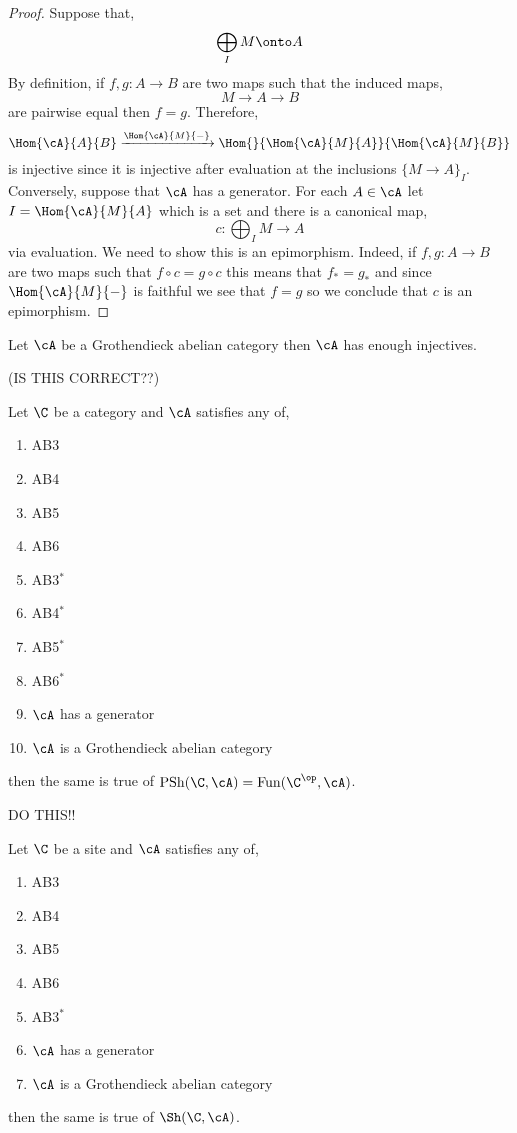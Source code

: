 \documentclass[12pt]{article}
\begin{document}
\begin{proof}
Suppose that,
\[ \bigoplus_I M \onto A \]
By definition, if $f,g : A \to B$ are two maps such that the induced maps,
\[ M \to A \to B \]
are pairwise equal then $f = g$. Therefore,
\[ \Hom{\cA}{A}{B} \xrightarrow{\Hom{\cA}{M}{-}} \Hom{}{\Hom{\cA}{M}{A}}{\Hom{\cA}{M}{B}} \]
is injective since it is injective after evaluation at the inclusions $\{ M \to A \}_I$.
\bigskip\\
Conversely, suppose that $\cA$ has a generator. For each $A \in \cA$ let $I = \Hom{\cA}{M}{A}$ which is a set and there is a canonical map,
\[ c : \bigoplus_I M \to A \]
via evaluation. We need to show this is an epimorphism. Indeed, if $f, g : A \to B$ are two maps such that $f \circ c = g \circ c$ this means that $f_* = g_*$ and since $\Hom{\cA}{M}{-}$ is faithful we see that $f = g$ so we conclude that $c$ is an epimorphism.  
\end{proof}

\begin{theorem}[1.10.1 in T\^{o}hoku] 
Let $\cA$ be a Grothendieck abelian category then $\cA$ has enough injectives.
\end{theorem}

\newcommand{\PSh}{\mathrm{PSh}}

(IS THIS CORRECT??)

\begin{prop}
Let $\C$ be a category and $\cA$ satisfies any of,
\begin{enumerate}
\item AB3
\item AB4
\item AB5
\item AB6
\item AB3$^*$
\item AB4$^*$
\item AB5$^*$
\item AB6$^*$
\item $\cA$ has a generator
\item $\cA$ is a Grothendieck abelian category 
\end{enumerate} 
then the same is true of $\PSh(\C, \cA) = \mathrm{Fun}(\C^\op, \cA)$.
\end{prop}

DO THIS!!

\begin{theorem}
Let $\C$ be a site and $\cA$ satisfies any of,
\begin{enumerate}
\item AB3
\item AB4
\item AB5
\item AB6
\item AB3$^*$
\item $\cA$ has a generator
\item $\cA$ is a Grothendieck abelian category
\end{enumerate}
then the same is true of $\Sh(\C, \cA)$.
\end{theorem}
\end{document}
